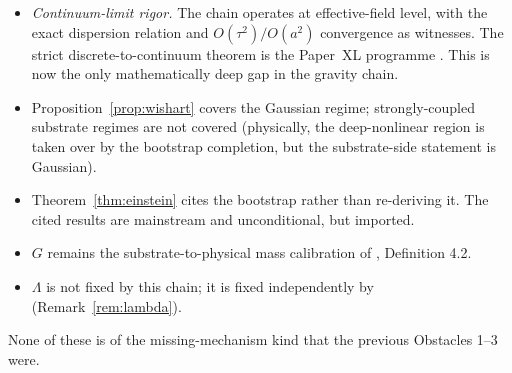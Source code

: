\documentclass[12pt]{article}
\theoremstyle{definition}
\theoremstyle{remark}
\begin{document}
\begin{itemize}
\item[\textbf{(R-cont)}] \emph{Continuum-limit rigor.} The chain operates at effective-field level, with the exact dispersion relation and $O(\tau^2)/O(a^2)$ convergence as witnesses. The strict discrete-to-continuum theorem is the Paper~XL programme \citep{SmartXL}. This is now the only mathematically deep gap in the gravity chain.
\item[\textbf{(R-Gauss)}] Proposition~\ref{prop:wishart} covers the Gaussian regime; strongly-coupled substrate regimes are not covered (physically, the deep-nonlinear region is taken over by the bootstrap completion, but the substrate-side statement is Gaussian).
\item[\textbf{(R-boot)}] Theorem~\ref{thm:einstein} cites the bootstrap rather than re-deriving it. The cited results are mainstream and unconditional, but imported.
\item[\textbf{(R-G)}] $G$ remains the substrate-to-physical mass calibration of \citep{SmartKappa}, Definition 4.2.
\item[\textbf{(R-$\Lambda$)}] $\Lambda$ is not fixed by this chain; it is fixed independently by \citep{SmartL} (Remark~\ref{rem:lambda}).
\end{itemize}

None of these is of the missing-mechanism kind that the previous Obstacles 1--3 were.
\end{document}
